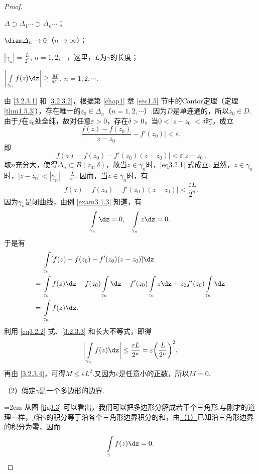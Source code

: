 \begin{proof}
\begin{eenum}
  \item \label{3.2.3.1}$\varDelta\supset\varDelta_1\cdots\supset\varDelta_n\cdots$；
  \item \label{3.2.3.2} $\diam\varDelta_n\to0$（$n\to\infty$）；
  \item \label{3.2.3.3}$|\gamma_n|=\frac{L}{2^n}$, $n=1,2,\cdots$，这里，$L$为$\gamma$的长度；
  \item \label{3.2.3.4}$\bigg|\int\limits_{\gamma_n}f(z)\dz\bigg|\ge\frac M{4^n}$, $n=1,2,\cdots$.
\end{eenum}

由 \ref{3.2.3.1} 和 \ref{3.2.3.2}，根据第 \ref{chap1} 章 \ref{sec1.5} 节中的Cantor定理（定理 \ref{thm1.5.3}），存在唯一的$z_0\in\varDelta_n$（$n=1,2,\cdots$）.因为$D$是单连通的，所以$z_0\in D$. 由于$f$在$z_0$处全纯，故对任意$\varepsilon>0$，存在$\delta>0$，当$0<|z-z_0|<\delta$时，成立
\begin{equation*}
\bigg|\frac{f(z)-f(z_0)}{z-z_0}-f'(z_0)\bigg|<\varepsilon,
\end{equation*}
即
\begin{equation}\label{eq3.2.1}
|f(z)-f(z_0)-f'(z_0)(z-z_0)|<\varepsilon|z-z_0|.
\end{equation}
取$n$充分大，使得$\varDelta_n\subset B(z_0,\delta)$，故当$z\in\gamma_n$时，\eqref{eq3.2.1} 式成立. 显然，$z\in\gamma_n$时，$|z-z_0|<|\gamma_n|=\frac L{2^n}$. 因而，当$z\in\gamma_n$时，有
\begin{equation}\label{eq3.2.2}
|f(z)-f(z_0)-f'(z_0)(z-z_0)|<\frac{\varepsilon L}{2^n}.
\end{equation}
因为$\gamma_n$是闭曲线，由例 \ref{exam3.1.3} 知道，有
\[\int\limits_{\gamma_n}\dz=0,\quad\int\limits_{\gamma_n}z\dz=0.\]
于是有
\begin{align*}
   &\int\limits_{\gamma_n}[f(z)-f(z_0)-f'(z_0)(z-z_0)]\dz\\
={}&\int\limits_{\gamma_n}f(z)\dz-f(z_0)\int\limits_{\gamma_n}\dz
-f'(z_0)\int\limits_{\gamma_n}z\dz+z_0f'(z_0)\int\limits_{\gamma_n}\dz\\
={}&\int\limits_{\gamma_n}f(z)\dz.
\end{align*}
利用 \eqref{eq3.2.2} 式、\ref{3.2.3.3} 和长大不等式，即得
\[\bigg|\int\limits_{\gamma_n}f(z)\dz\bigg|\le\frac{\varepsilon L}{2^n}
  = \varepsilon\bigg(\frac{L}{2^n}\bigg)^2.\]
再由 \ref{3.2.3.4}，可得$M\le\varepsilon L^2$.又因为$\varepsilon$是任意小的正数，所以$M=0$.

（2）假定$\gamma$是一个多边形的边界.\\[2mm]
\noindent\begin{minipage}{0.7\textwidth}\parindent=2em
从图 \ref{fig3.3} 可以看出，我们可以把多边形分解成若干个三角形.与刚才的道理一样，$f$沿$\gamma$的积分等于沿各个三角形边界积分的和，由\hyperlink{thm3.2.3.1}{（1）}已知沿三角形边界的积分为零，因而
\[\int\limits_\gamma f(z)\dz=0.\]


\end{minipage}
\end{proof}
